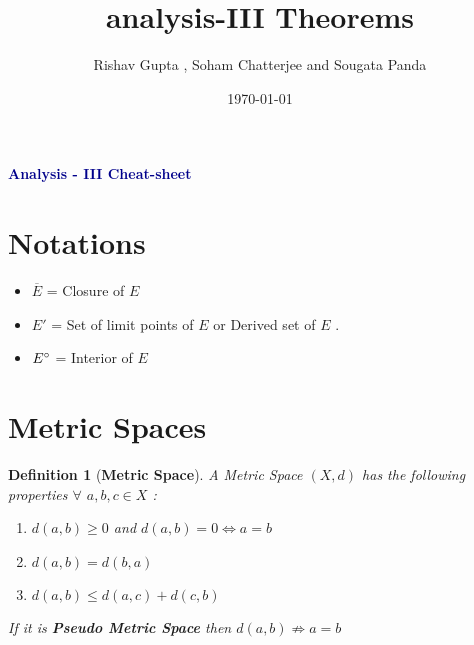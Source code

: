 \documentclass{article}
\title{analysis-III Theorems}
\author{ Rishav Gupta , Soham Chatterjee and Sougata Panda }
\date{\today}
\newtheorem{defn}{Definition}[section]
\begin{document}
	\Large
\begin{center}
	\huge
	\textcolor{DarkBlue}{\textbf{\sffamily Analysis - III Cheat-sheet}}
\end{center}
\vspace{0.3cm}

\section{Notations}
\begin{itemize}
	\item $\overline{E}$ = Closure of $E$
	\item  $E'$ = Set of limit points of $E$ or Derived set of $E$ .
	\item $E\degree$ =  Interior of $E$ 

\end{itemize}
\section{Metric Spaces}
\begin{defn}[\textbf{Metric Space}] 	A Metric Space $(X,d)$ has the following properties $\forall$ $a,b, c\in X$ :\begin{enumerate}[label = (\roman*)]
		\item   $d(a,b)\geq 0$ and $d(a,b)=0 \iff a=b$
		\item  $d(a,b)=d(b,a)$
		\item $d(a,b)\leq d(a,c)+ d(c,b)$
	\end{enumerate}
If it is \textbf{Pseudo Metric Space} then $d(a,b)\nRightarrow a=b$
\end{defn}




\end{document}
